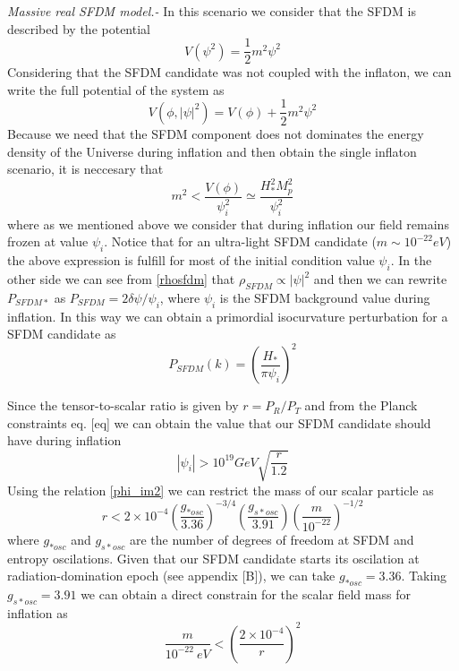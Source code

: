 \documentclass[twocolumn,           %
               showpacs,            %
               preprintnumbers,     %
               aps,                 %
               prl,          	    %
               letterpaper,             %
               superscriptaddress,      %
               nofootinbib,         %
               tightenlines,        %
               floats,floatfix      %
               ,usenatbib,
               ]{revtex4-1}
\begin{document}
\textit{Massive real SFDM model.-} In this scenario we consider that the SFDM is described by the potential
\begin{equation}
V(\psi^2)=\frac{1}{2}m^2\psi^2
\end{equation}
Considering that the SFDM candidate was not coupled with the inflaton, we can write the full potential of the system as
\begin{equation}
V(\phi,|\psi|^2)=V(\phi)+\frac{1}{2}m^2\psi^2
\end{equation}
Because we need that the SFDM component does not dominates the energy density of the Universe during inflation and then obtain the single inflaton scenario, it is neccesary that 
\begin{equation}
m^2 < \frac{V(\phi)}{\psi_i^2}\simeq \frac{H^2_{*}M_p^2}{\psi_i^2}
\end{equation}
where as we mentioned above we consider that during inflation our field remains frozen  at value $\psi_i$. Notice that for an ultra-light SFDM candidate  ($m\sim 10^{-22}eV$) the above expression is fulfill for most of the initial condition value $\psi_i$. In the other side we can see from \eqref{rhosfdm} that $\rho_{SFDM}\propto |\psi|^2$ and then we can rewrite $P_{SFDM*}$ as 
$P_{SFDM} = 2\delta \psi/\psi_i
$, where $\psi_i$ is the SFDM background value during inflation. In this way we can obtain a primordial isocurvature perturbation for a SFDM candidate as
\begin{equation}
P_{SFDM}(k)=\left(\frac{H_*}{\pi \psi_i}\right)^2
\end{equation}

Since the tensor-to-scalar ratio is given by $r=P_R/P_T$ and from the Planck constraints  eq. [eq] we can obtain the value that our SFDM candidate should have during inflation
\begin{equation}\label{initial_c}
|\psi_i|>10^{19}GeV\sqrt{\frac{r}{1.2}}
\end{equation}
Using the relation \eqref{phi_im2} we can restrict the mass of our scalar particle as  
\begin{equation}
r<2\times 10^{-4}\left(\frac{g_{*osc}}{3.36}\right)^{-3/4}\left(\frac{g_{s*osc}}{3.91}\right)\left(\frac{m}{10^{-22}}\right)^{-1/2}
\end{equation}
where $g_{*osc}$ and $g_{s*osc}$ are the number of degrees of freedom at SFDM and entropy oscilations. Given that our SFDM candidate starts its oscilation at radiation-domination epoch (see appendix [B]), we can take $g_{*osc}=3.36$. Taking $g_{s*osc}=3.91$ we can obtain a direct constrain for the scalar field mass for inflation as 
\begin{equation}\label{constm}
\frac{m}{10^{-22}\ eV}<\left(\frac{2\times 10^{-4}}{r}\right)^2
\end{equation}
\end{document}
